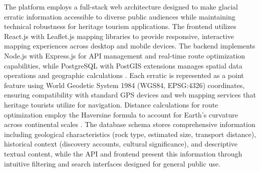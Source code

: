 The platform employs a full-stack web architecture designed to make glacial erratic information accessible to diverse public audiences while maintaining technical robustness for heritage tourism applications. The frontend utilizes React.js with Leaflet.js mapping libraries to provide responsive, interactive mapping experiences across desktop and mobile devices. The backend implements Node.js with Express.js for API management and real-time route optimization capabilities, while PostgreSQL with PostGIS extensions manages spatial data operations and geographic calculations \cite{HofmannWellenhof2006}. Each erratic is represented as a point feature using World Geodetic System 1984 (WGS84, EPSG:4326) coordinates, ensuring compatibility with standard GPS devices and web mapping services that heritage tourists utilize for navigation. Distance calculations for route optimization employ the Haversine formula to account for Earth's curvature across continental scales \cite{Snyder1987}. The database schema stores comprehensive information including geological characteristics (rock type, estimated size, transport distance), historical context (discovery accounts, cultural significance), and descriptive textual content, while the API and frontend present this information through intuitive filtering and search interfaces designed for general public use.


